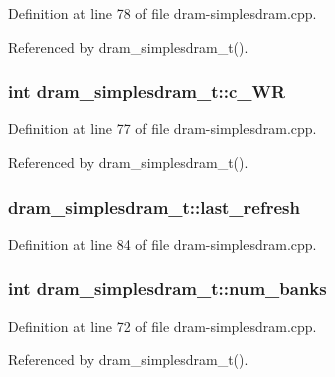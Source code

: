 Definition at line 78 of file dram-simplesdram.cpp.

Referenced by dram\_\-simplesdram\_\-t().
\subsubsection[{c\_\-WR}]{\setlength{\rightskip}{0pt plus 5cm}int {\bf dram\_\-simplesdram\_\-t::c\_\-WR}\hspace{0.3cm}{\tt  [protected]}}\label{classdram__simplesdram__t_ddc00e4bc5aed041685c2154324f2a12}




Definition at line 77 of file dram-simplesdram.cpp.

Referenced by dram\_\-simplesdram\_\-t().
\subsubsection[{last\_\-refresh}]{ {\bf dram\_\-simplesdram\_\-t::last\_\-refresh}\hspace{0.3cm}{\tt  [protected]}}\label{classdram__simplesdram__t_c4079911cdc1bdcb8a4051f75d339833}




Definition at line 84 of file dram-simplesdram.cpp.
\subsubsection[{num\_\-banks}]{\setlength{\rightskip}{0pt plus 5cm}int {\bf dram\_\-simplesdram\_\-t::num\_\-banks}\hspace{0.3cm}{\tt  [protected]}}\label{classdram__simplesdram__t_a85882183dd042c33be5aeeb7bda43d1}




Definition at line 72 of file dram-simplesdram.cpp.

Referenced by dram\_\-simplesdram\_\-t().
